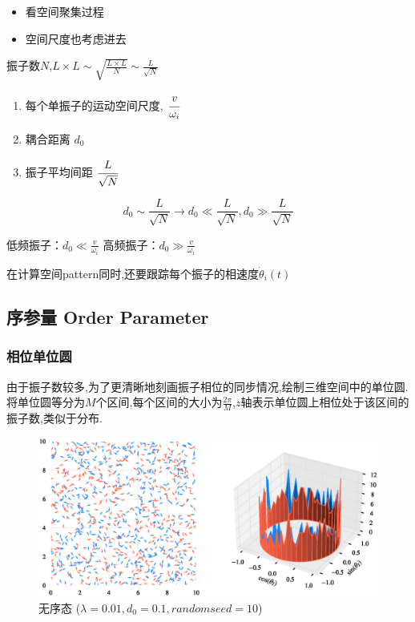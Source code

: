 \documentclass{article}
\begin{document}
\begin{itemize}
    \item 看空间聚集过程
    \item 空间尺度也考虑进去
\end{itemize}

振子数$N$,$L\times L\sim \sqrt{\frac{L\times L}{N}}\sim \frac{L}{\sqrt{N}}$

\begin{enumerate}
    \item 每个单振子的运动空间尺度, $\cfrac{v}{\omega_i}$
    \item 耦合距离 $d_0$
    \item 振子平均间距 $\cfrac{L}{\sqrt{N}}$
\end{enumerate}

$$
d_0\sim \frac{L}{\sqrt{N}}\rightarrow d_0\ll \frac{L}{\sqrt{N}}, d_0\gg \frac{L}{\sqrt{N}}
$$

低频振子：$d_0\ll \frac{v}{\omega _i}$
高频振子：$d_0\gg \frac{v}{\omega _i}$

在计算空间pattern同时,还要跟踪每个振子的相速度$\dot{\theta}_i(t)$

\newpage
\subsection{序参量 Order Parameter}

\subsubsection{相位单位圆}

由于振子数较多,为了更清晰地刻画振子相位的同步情况,绘制三维空间中的单位圆. 将单位圆等分为$M$个区间,每个区间的大小为$\frac{2\pi}{M}$,$z$轴表示单位圆上相位处于该区间的振子数,类似于分布.

\begin{figure}[H]
	\centering
	\includegraphics[width=\textwidth]{./figs/CorrectCoupling_uniform_0.010_0.10.eps}
	\vspace{-1cm}
	\caption{无序态 ($\lambda=0.01, d_0=0.1, random seed=10$)}
	\label{fig:fig231.1}
\end{figure}
\end{document}
